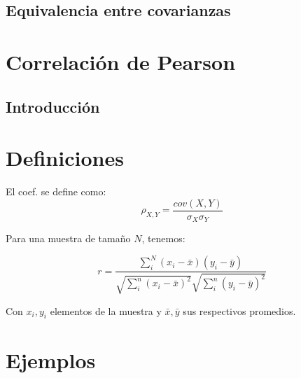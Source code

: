	\subsection{Equivalencia entre covarianzas}
\section[]{Correlaci\'on de Pearson}

	\subsection{Introducci\'on}

		
	 
	\section{Definiciones}
	
	El coef. se define como:
	\begin{equation}\label{pearson_orig}
		\rho_{X,Y}=\frac{cov(X,Y)}{\sigma_X\sigma_Y}
	\end{equation}
	
	Para una muestra de tama\~no $N$, tenemos:
	
	\begin{equation}\label{pearson_r}
		r=\frac{\sum_{i}^N\left(x_{i}-\bar{x}\right)\left(y_{i}-\bar{y}\right)}{\sqrt{\sum_{i}^n\left(x_{i}-\bar{x}\right)^{2}} \sqrt{\sum_{i}^n\left(y_{i}-\bar{y}\right)^{2}}}
	\end{equation}
	
	Con $x_i,y_i$ elementos de la muestra y $\bar{x},\bar{y}$ sus respectivos promedios.

\section{Ejemplos}


	\newpage